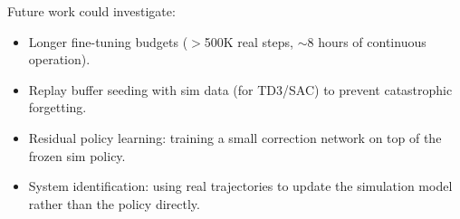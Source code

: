 Future work could investigate:
\begin{itemize}
  \item Longer fine-tuning budgets ($>$500K real steps,
    $\sim$8 hours of continuous operation).
  \item Replay buffer seeding with sim data (for TD3/SAC)
    to prevent catastrophic forgetting.
  \item Residual policy learning: training a small correction
    network on top of the frozen sim policy.
  \item System identification: using real trajectories to
    update the simulation model rather than the policy directly.
\end{itemize}
